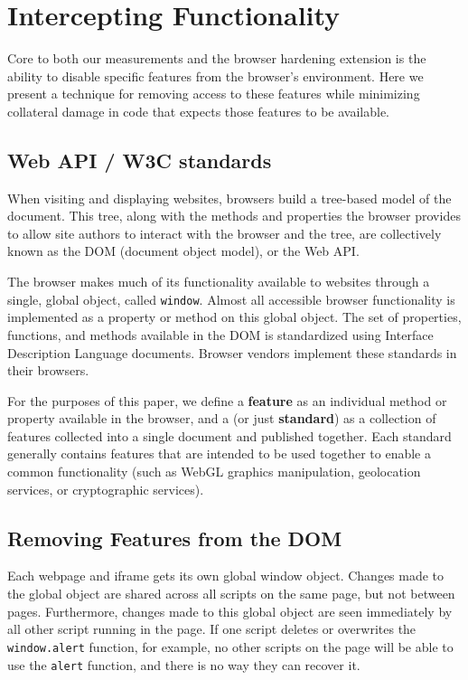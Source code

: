 \section{Intercepting \JS Functionality}
\label{cost-benefit:intercepting-js}

Core to both our measurements and the browser hardening extension is the
ability to disable specific features from the browser's \JS environment.  Here we
present a technique for removing access to these features
while minimizing collateral damage in code that expects those
features to be available.


\subsection{Web API / W3C standards}
\label{cost-benefit:intercepting-js:webapi}
When visiting and displaying websites, browsers build a tree-based model of the
document.  This tree, along with the methods and properties the browser provides
to allow site authors to interact with the browser and the tree, are collectively
known as the DOM (document object model), or the Web API.

The browser makes much of its functionality available to websites
through a single, global object, called \texttt{window}.  Almost all \JS
accessible browser functionality is implemented as a property or method on this
global object.  The set of properties, functions, and methods available in
the DOM is standardized using Interface Description Language documents. Browser
vendors implement these standards in their browsers.

For the purposes of this paper, we define a \textbf{feature} as an individual
\JS method or property available in the browser, and a \textbf{\WAS} (or
just \textbf{standard}) as a collection of features collected into a single
document and published together.  Each standard generally contains features
that are intended to be used together to enable a common functionality (such as
WebGL graphics manipulation, geolocation services, or cryptographic services).


\subsection{Removing Features from the DOM}
\label{cost-benefit:intercepting-js:featremove}
Each webpage and iframe gets its own global
window object.  Changes made to the global object are shared across all scripts
on the same page, but not between pages.  Furthermore, changes made to this
global object are seen immediately by all other script running in the page.  If
one script deletes or overwrites the \texttt{window.alert}
function, for example, no other scripts on the page will be able to use the
\texttt{alert} function, and there is no way they can recover it.

